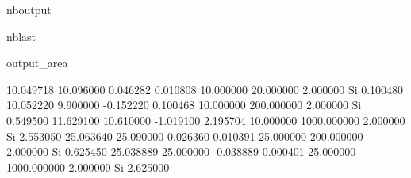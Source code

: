 \documentclass[letterpaper,10pt,english]{sphinxmanual}
\begin{document}
\begin{sphinxuseclass}{nboutput}
\begin{sphinxuseclass}{nblast}
{\begin{sphinxuseclass}{output_area}
\begin{sphinxuseclass}{}
\begin{sphinxVerbatim}[commandchars=\\\{\}]
10.049718            10.096000            0.046282             0.010808                  10.000000            20.000000            2.000000             Si              0.100480
10.052220            9.900000             -0.152220            0.100468                  10.000000            200.000000           2.000000             Si              0.549500
11.629100            10.610000            -1.019100            2.195704                  10.000000            1000.000000          2.000000             Si              2.553050
25.063640            25.090000            0.026360             0.010391                  25.000000            200.000000           2.000000             Si              0.625450
25.038889            25.000000            -0.038889            0.000401                  25.000000            1000.000000          2.000000             Si              2.625000


\end{sphinxVerbatim}
\end{sphinxuseclass}
\end{sphinxuseclass}}
\end{sphinxuseclass}
\end{sphinxuseclass}
\end{document}
